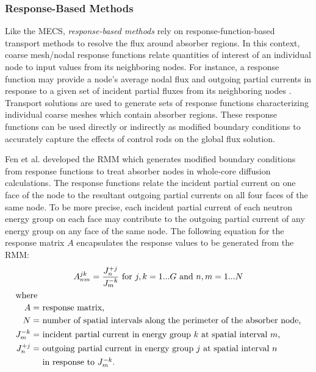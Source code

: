\subsubsection{Response-Based Methods}

Like the \gls{MECS}, \textit{response-based methods} rely on response-function-based
transport methods to resolve the flux around absorber regions. In this context, coarse mesh/nodal
response functions relate quantities of interest of an individual node to input values from its
neighboring nodes. For instance, a response function may provide a node's average nodal flux and
outgoing partial currents in response to a given set of incident
partial fluxes from its neighboring nodes \cite{ougouag_transport_2010}. Transport solutions are
used to generate sets of response functions characterizing individual coarse meshes which contain
absorber regions. These response functions can be used directly or indirectly as modified boundary
conditions to accurately capture the effects of control rods on the global flux solution.

Fen et al. \cite{fen_modelling_1992} developed the \gls{RMM} which generates modified boundary
conditions from response functions to treat absorber nodes in whole-core diffusion calculations.
The response functions relate the incident partial current on one face of the node to the resultant
outgoing partial currents on all four faces of the same node. To be more precise, each incident
partial current of each neutron energy group on each face may contribute to the outgoing partial
current of any energy group on any face of the same node. The following equation for the response
matrix $A$ encapsulates the response values to be generated from the \gls{RMM}:
%
\begin{gather}
  A^{jk}_{nm} = \frac{J^{+j}_n}{J^{-k}_m} \mbox{ for } j,k=1...G \mbox{ and } n,m=1...N
  \label{eq:rmm} \\
  \shortintertext{where}
  \begin{align}
    A =& \mbox{ response matrix,} \nonumber \\
    N =& \mbox{ number of spatial intervals along the perimeter of the absorber node,} \nonumber \\
    J^{-k}_m =& \mbox{ incident partial current in energy group $k$ at spatial interval $m$,}
      \nonumber \\
    J^{+j}_n =& \mbox{ outgoing partial current in energy group $j$ at spatial interval $n$}
      \nonumber \\
    &\mbox{ in response to $J^{-k}_m$.} \nonumber
  \end{align}
\end{gather}

